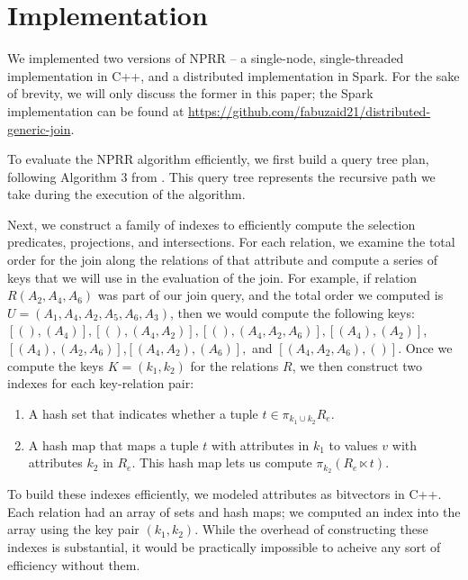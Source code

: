 \section{Implementation}

We implemented two versions of NPRR -- a single-node, single-threaded implementation in C++, and a distributed implementation in Spark. For the sake of brevity, we will only discuss the former in this paper; the Spark implementation can be found at \url{https://github.com/fabuzaid21/distributed-generic-join}.

To evaluate the NPRR algorithm efficiently, we first build a query tree plan, following Algorithm 3 from \cite{ngo2012worst}. This query tree represents the recursive path we take during the execution of the algorithm.

Next, we construct a family of indexes to efficiently compute the selection predicates, projections, and intersections. For each relation, we examine the total order for the join along the relations of that attribute and compute a series of keys that we will use in the evaluation of the join. For example, if relation $R(A_2, A_4, A_6)$ was part of our join query, and the total order we computed is $U = (A_1, A_4, A_2, A_5, A_6, A_3)$, then we would compute the following keys: $[(),(A_4)], [(),(A_4, A_2)], [(),(A_4, A_2, A_6)], [(A_4),(A_2)]$,\\
$[(A_4),(A_2, A_6)]$,$[(A_4, A_2),(A_6)],$ and $[(A_4, A_2, A_6),()]$. 
Once we compute the keys $K = (k_1, k_2)$ for the relations $R$, we then construct two indexes for each key-relation pair:

\begin{enumerate}
\item A hash set that indicates whether a tuple $t \in \pi_{k_1 \cup k_2} R_e$. 
\item A hash map that maps a tuple $t$ with attributes in $k_1$ to values $v$ with attributes $k_2$ in $R_e$. This hash map lets us compute $\pi_{k_2} (R_e \ltimes t)$.
\end{enumerate}

To build these indexes efficiently, we modeled attributes as bitvectors in C++. Each relation had an array of sets and hash maps; we computed an index into the array using the key pair $(k_1, k_2)$. While the overhead of constructing these indexes is substantial, it would be practically impossible to acheive any sort of efficiency without them.
